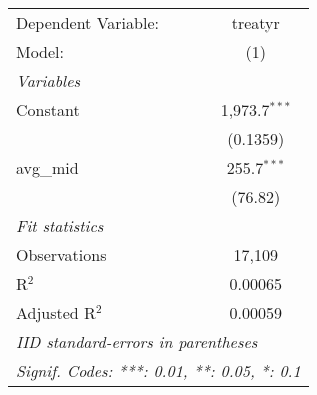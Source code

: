 
\begingroup
\centering
\begin{tabular}{lc}
   \tabularnewline \midrule \midrule
   Dependent Variable: & treatyr\\  
   Model:              & (1)\\  
   \midrule
   \emph{Variables}\\
   Constant            & 1,973.7$^{***}$\\   
                       & (0.1359)\\   
   avg\_mid            & 255.7$^{***}$\\   
                       & (76.82)\\   
   \midrule
   \emph{Fit statistics}\\
   Observations        & 17,109\\  
   R$^2$               & 0.00065\\  
   Adjusted R$^2$      & 0.00059\\  
   \midrule \midrule
   \multicolumn{2}{l}{\emph{IID standard-errors in parentheses}}\\
   \multicolumn{2}{l}{\emph{Signif. Codes: ***: 0.01, **: 0.05, *: 0.1}}\\
\end{tabular}
\par\endgroup


